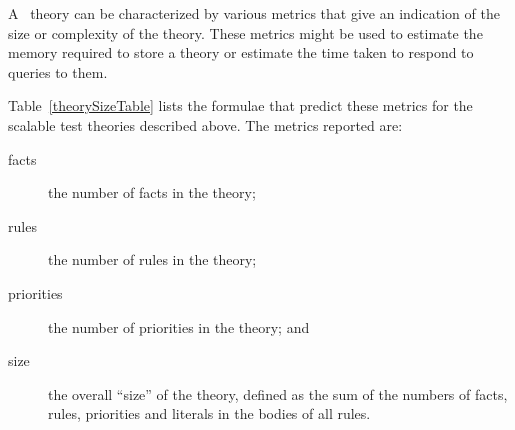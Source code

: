 {\begin{table*}[t]
\end{table*}

A \deimos\ theory can be characterized by various metrics that
give an indication of the size or complexity of the theory.
These metrics might be used to estimate the memory required to
store a theory or estimate the time taken to respond to
queries to them.

Table~\ref{theorySizeTable} lists the formulae that predict these metrics for the 
scalable test theories described above. The metrics reported
are:

\begin{description}
   \item[facts] the number of facts in the theory;
   \item[rules] the number of rules in the theory;
   \item[priorities] the number of priorities in the theory; and
   \item[size] the overall ``size'' of the theory, defined as
      the sum of the numbers of facts, rules, priorities
      and literals in the bodies of all rules.
\end{description}

}
